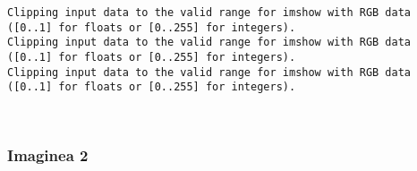\documentclass[11pt]{article}
\begin{document}
    \begin{Verbatim}[commandchars=\\\{\}]
Clipping input data to the valid range for imshow with RGB data ([0..1] for floats or [0..255] for integers).
Clipping input data to the valid range for imshow with RGB data ([0..1] for floats or [0..255] for integers).
Clipping input data to the valid range for imshow with RGB data ([0..1] for floats or [0..255] for integers).

    \end{Verbatim}

    \begin{center}
    \end{center}
    { \hspace*{\fill} \\}
    
    \subsubsection{Imaginea 2}\label{imaginea-2}
\end{document}

